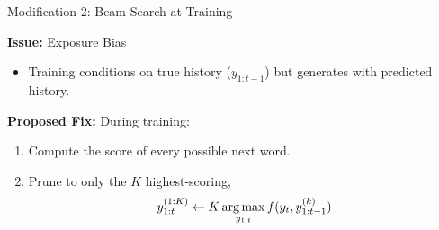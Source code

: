\begin{frame}{Modification 2: Beam Search at Training}

  \textbf{Issue:}  Exposure Bias
    \begin{itemize}
    \item Training conditions on true history ($y_{1:t-1}$) but generates with predicted history.
    \end{itemize}

   \textbf{Proposed Fix:} During training:
   \begin{enumerate}
   \item Compute the score of every possible next word.



   \item Prune to only the $K$ highest-scoring,
     \[y_{1:t}^{(1:K)} \gets K\argmax_{y_{1:t}} f(y_t, y_{1:t-1}^{(k)})\]
   \end{enumerate}

\end{frame}


